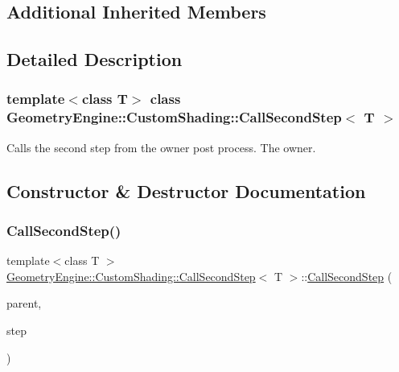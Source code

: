 \subsection*{Additional Inherited Members}


\subsection{Detailed Description}
\subsubsection*{template$<$class T$>$\newline
class Geometry\+Engine\+::\+Custom\+Shading\+::\+Call\+Second\+Step$<$ T $>$}

Calls the second step from the owner post process. The owner. 

\subsection{Constructor \& Destructor Documentation}
\mbox{\label{class_geometry_engine_1_1_custom_shading_1_1_call_second_step_af361c6d6557602e99d03ea7d2c7ea8e1}} 
\subsubsection{\texorpdfstring{CallSecondStep()}{CallSecondStep()}\hspace{0.1cm}{\footnotesize\ttfamily [1/2]}}
{\footnotesize\ttfamily template$<$class T $>$ \\
\mbox{\hyperlink{class_geometry_engine_1_1_custom_shading_1_1_call_second_step}{Geometry\+Engine\+::\+Custom\+Shading\+::\+Call\+Second\+Step}}$<$ T $>$\+::\mbox{\hyperlink{class_geometry_engine_1_1_custom_shading_1_1_call_second_step}{Call\+Second\+Step}} (\begin{DoxyParamCaption}\item[{\mbox{\hyperlink{class_geometry_engine_1_1_custom_shading_1_1_custom_post_process_step_interface}{Custom\+Post\+Process\+Step\+Interface}} $\ast$}]{parent,  }\item[{\mbox{\hyperlink{namespace_geometry_engine_1_1_custom_shading_a09e44ca81de5fe08c6d50271d680c4b1}{Custom\+Post\+Process\+Steps}}}]{step }\end{DoxyParamCaption})\hspace{0.3cm}{\ttfamily [inline]}}

